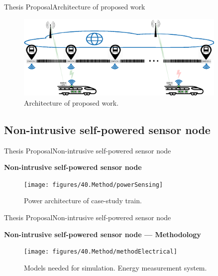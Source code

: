 \begin{frame}{Thesis Proposal}{Architecture of proposed work}

	\begin{figure}[ht!]
		\centering
		\includegraphics[width=0.9\textwidth,keepaspectratio]{figures/40.Method/architecture}
		\caption{Architecture of proposed work.}
	\end{figure}
		

\end{frame}


\subsection{Non-intrusive self-powered sensor node}


\begin{frame}{Thesis Proposal}{Non-intrusive self-powered sensor node}
\begin{block}{\textbf{Non-intrusive self-powered sensor node}}
	\begin{figure}[ht!]
		\centering
		\texttt{[image: figures/40.Method/powerSensing]}
		\caption{Power architecture of case-study train.}
	\end{figure}
\end{block}
\end{frame}

\begin{frame}{Thesis Proposal}{Non-intrusive self-powered sensor node}
\begin{block}{\textbf{Non-intrusive self-powered sensor node --- Methodology}}

	\begin{figure}[ht!]
		\centering
		\texttt{[image: figures/40.Method/methodElectrical]}
		\caption{Models needed for simulation. Energy measurement system.}
	\end{figure}

\end{block}
\end{frame}

